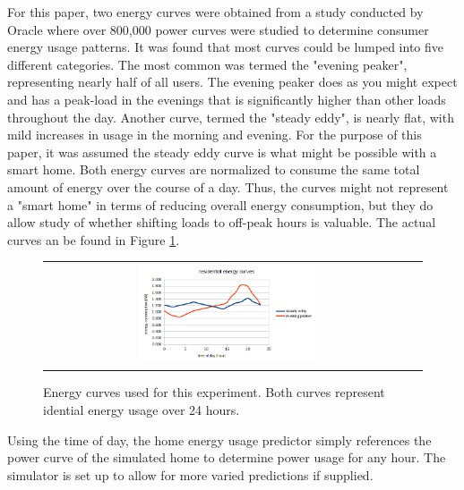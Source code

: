 \begin{itemize}
  For this paper, two energy curves were obtained from a study conducted by Oracle \cite{fischer_we_2014} where over 800,000 power curves were studied to determine consumer energy usage patterns. It was found that most curves could be lumped into five different categories. The most common was termed the "evening peaker", representing nearly half of all users. The evening peaker does as you might expect and has a peak-load in the evenings that is significantly higher than other loads throughout the day. Another curve, termed the "steady eddy", is nearly flat, with mild increases in usage in the morning and evening. For the purpose of this paper, it was assumed the steady eddy curve is what might be possible with a smart home. Both energy curves are normalized to consume the same total amount of energy over the course of a day. Thus, the curves might not represent a "smart home" in terms of reducing overall energy consumption, but they do allow study of whether shifting loads to off-peak hours is valuable. The actual curves  an be found in Figure \ref{energy_curves}.

  \begin{figure}
   \begin{center}
    \begin{tabular}{cc}
     \includegraphics[width=0.50\textwidth]{./figures/energy_curves.png} \\
     \end{tabular}
     \end{center}
  \caption{Energy curves used for this experiment. Both curves represent idential energy usage over 24 hours.}
    \vspace{+1mm}
  \label{energy_curves}
  \end{figure}

  Using the time of day, the home energy usage predictor simply references the power curve of the simulated home to determine power usage for any hour. The simulator is set up to allow for more varied predictions if supplied.
\end{itemize}

